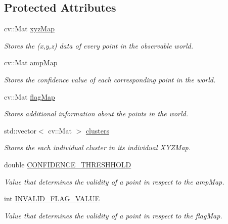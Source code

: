 \subsection*{Protected Attributes}
\begin{DoxyCompactItemize}
\item 
cv\+::\+Mat \hyperlink{class_depth_camera_a10123e69a9879a27a2c5ae434a916a5e}{xyz\+Map}
\begin{DoxyCompactList}\small\item\em Stores the (x,y,z) data of every point in the observable world. \end{DoxyCompactList}\item 
cv\+::\+Mat \hyperlink{class_depth_camera_a067d5cd9eedcdaa95cc440e7381fdb9c}{amp\+Map}
\begin{DoxyCompactList}\small\item\em Stores the confidence value of each corresponding point in the world. \end{DoxyCompactList}\item 
cv\+::\+Mat \hyperlink{class_depth_camera_a5b6e685ea92518f7deeb317ff6d0358f}{flag\+Map}
\begin{DoxyCompactList}\small\item\em Stores additional information about the points in the world. \end{DoxyCompactList}\item 
std\+::vector$<$ cv\+::\+Mat $>$ \hyperlink{class_depth_camera_a333347ab312906b2196596b078fc98b4}{clusters}
\begin{DoxyCompactList}\small\item\em Stores the each individual cluster in its individual X\+Y\+Z\+Map. \end{DoxyCompactList}\item 
double \hyperlink{class_depth_camera_a4a2bb91ca2e9be53a53c4a6dcf0e1677}{C\+O\+N\+F\+I\+D\+E\+N\+C\+E\+\_\+\+T\+H\+R\+E\+S\+H\+H\+O\+LD}
\begin{DoxyCompactList}\small\item\em Value that determines the validity of a point in respect to the amp\+Map. \end{DoxyCompactList}\item 
int \hyperlink{class_depth_camera_af7eb5186ae7366de110bb5b08803e11d}{I\+N\+V\+A\+L\+I\+D\+\_\+\+F\+L\+A\+G\+\_\+\+V\+A\+L\+UE}
\begin{DoxyCompactList}\small\item\em Value that determines the validity of a point in respect to the flag\+Map. \end{DoxyCompactList}\item 

\end{DoxyCompactItemize}
